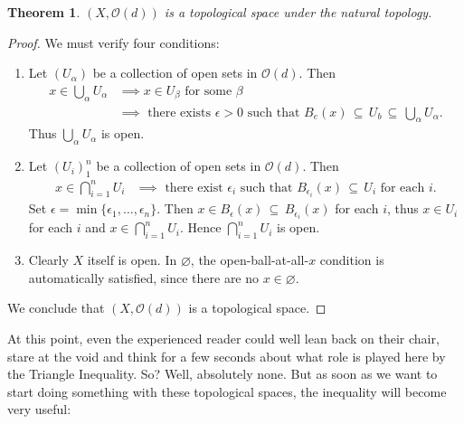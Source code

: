 \documentclass[11pt]{article}
\newtheorem{theorem}{Theorem}
\renewcommand{\O}{\mathcal{O}}
\begin{document}
\begin{adjustwidth}{0.5cm}{}
  \begin{theorem}
    $(X, \O(d))$ is a topological space under the natural topology.
  \end{theorem}
  \begin{proof}
    We must verify four conditions:
    \begin{enumerate}
      \item Let $(U_{\alpha})$ be a collection of open sets in $\O(d)$. Then
      \begin{align*}
        x \in \bigcup\limits_{\alpha} U_{\alpha} & \implies x \in U_{\beta} \text{ for some } \beta \\
                                                 & \implies \text{ there exists } \epsilon > 0 \text{ such that } B_{e}(x) \, \subseteq \, U_{b} \, \subseteq \, \bigcup\limits_{\alpha} U_{\alpha}.
      \end{align*}
      Thus $\bigcup_{\alpha} U_{\alpha}$ is open.
      \item Let $(U_{i})_{1}^{n}$ be a collection of open sets in $\O(d)$. Then
      \begin{align*}
        x \in \bigcap\limits_{i = 1}^{n} U_{i} & \implies \text{ there exist $\epsilon_{i}$ such that $B_{\epsilon_{i}}(x) \, \subseteq \, U_{i}$ for each $i$}.
      \end{align*}
      Set $\epsilon = \min\{\epsilon_{1}, \ldots, \epsilon_{n}\}$. Then $x \in B_{\epsilon}(x) \, \subseteq \, B_{\epsilon_{i}}(x)$ for each $i$, thus $x \in U_{i}$ for each $i$ and $x \in \bigcap_{i = 1}^{n} U_{i}$. Hence $\bigcap_{i = 1}^{n} U_{i}$ is open.
      \item Clearly $X$ itself is open. In $\varnothing$, the open-ball-at-all-$x$ condition is automatically satisfied, since there are no $x \in \varnothing$.
    \end{enumerate}
    We conclude that $(X, \O(d))$ is a topological space.
  \end{proof}
\end{adjustwidth}

At this point, even the experienced reader could well lean back on their chair, stare at the void and think for a few seconds about what role is played here by the Triangle Inequality. So? Well, absolutely none. But as soon as we want to start doing something with these topological spaces, the inequality will become very useful:
\end{document}
